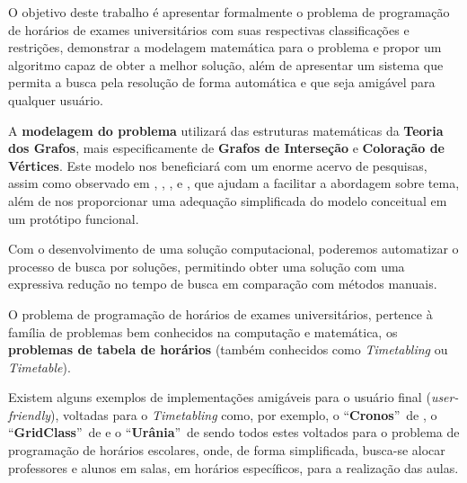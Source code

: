 




O objetivo deste trabalho é apresentar formalmente o problema de programação de horários de exames universitários com suas respectivas classificações e restrições, demonstrar a modelagem matemática para o problema e propor um algoritmo capaz de obter a melhor solução, além de apresentar um sistema que permita a busca pela resolução de forma automática e que seja amigável para qualquer usuário.

A \textbf{modelagem do problema} utilizará das estruturas matemáticas da \textbf{Teoria dos Grafos}, mais especificamente de \textbf{Grafos de Interseção} e \textbf{Coloração de Vértices}. Este modelo nos beneficiará com um enorme acervo de pesquisas, assim como observado em , , ,  e , que ajudam a facilitar a abordagem sobre tema, além de nos proporcionar uma adequação simplificada do modelo conceitual em um protótipo funcional.

Com o desenvolvimento de uma solução computacional, poderemos automatizar o processo de busca por soluções, permitindo obter uma solução com uma expressiva redução no tempo de busca em comparação com métodos manuais. 

O problema de programação de horários de exames universitários, pertence à família de problemas bem conhecidos  na computação e matemática, os \textbf{problemas de tabela de horários} (também conhecidos como \emph{Timetabling} ou \emph{Timetable}). 

Existem alguns exemplos de implementações amigáveis para o usuário final (\emph{user-friendly}), voltadas para o \emph{Timetabling} como, por exemplo, o “\textbf{Cronos}”\ de , o “\textbf{GridClass}”\ de  e o “\textbf{Urânia}”\ de  sendo todos estes voltados para o problema de programação de horários escolares, onde, de forma simplificada, busca-se alocar professores e alunos em salas, em horários específicos, para a realização das aulas.

